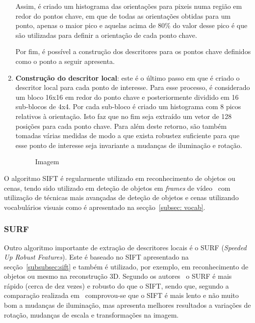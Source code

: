 \begin{enumerate}
Assim, é criado um histograma das orientações para pixeis numa região em redor do pontos chave, em que de todas as orientações obtidas para um ponto, apenas o maior pico e aquelas acima de 80\% do valor desse pico é que são utilizadas para definir a orientação de cada ponto chave.

Por fim, é possível a construção dos descritores para os pontos chave definidos como o ponto a seguir apresenta.

\item \textbf{Construção do descritor local}: este é o último passo em que é criado o descritor local para cada ponto de interesse. Para esse processo, é considerado um bloco 16x16 em redor do ponto chave e posteriormente dividido em 16 sub-blocos de 4x4. Por cada sub-bloco é criado um histograma com 8 picos relativos à orientação. Isto faz que no fim seja extraído um vetor de 128 posições para cada ponto chave. Para além deste retorno, são também tomadas várias medidas de modo a que exista robustez suficiente para que esse ponto de interesse seja invariante a mudanças de iluminação e rotação. 

\begin{figure}
\centering
\caption{Imagem}
\end{figure}
 
\end{enumerate}

O algoritmo SIFT é regularmente utilizado em reconhecimento de objetos ou cenas, tendo sido utilizado em deteção de objetos em \textit{frames} de vídeo~\cite{Sivic2003, Sivic2006} com utilização de técnicas mais avançadas de deteção de objetos e cenas utilizando vocabulários visuais como é apresentado na secção~\ref{subsec: vocab}.

\subsubsection{SURF} \label{subsubsec:surf}

Outro algoritmo importante de extração de descritores locais é o SURF (\textit{Speeded Up Robust Features}). Este é baseado no SIFT apresentado na secção~\ref{subsubsec:sift} e também é utilizado, por exemplo, em reconhecimento de objetos ou mesmo na reconstrução 3D. Segundo os autores~\cite{Bay2006} o SURF é mais rápido (cerca de dez vezes) e robusto do que o SIFT, sendo que, segundo a comparação realizada em~\cite{Juan2009} comprovou-se que o SIFT é mais lento e não muito bom a mudanças de iluminação, mas apresenta melhores resultados a variações de rotação, mudanças de escala e transformações na imagem.

